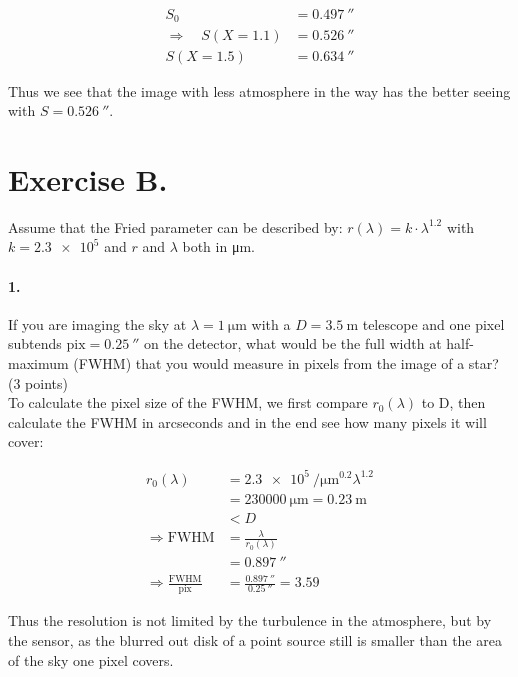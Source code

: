 \documentclass[11pt,a4paper,twoside]{article}
\begin{document}
\begin{align}
S_0 &= \SI{0.497}{\arcsecond} \\
\Rightarrow\quad S(X=1.1) &= \SI{0.526}{\arcsecond} \\
S(X=1.5) &= \SI{0.634}{\arcsecond}
\end{align}

Thus we see that the image with less atmosphere in the way has the better
seeing with $S = \SI{0.526}{\arcsecond}$. \\


\section*{Exercise B.}
Assume that the Fried parameter can be described by:
$r(\lambda) = k \cdot \lambda^{1.2}$ with $k = \num{2.3e5}$ and $r$ and
$\lambda$ both in \si{\micro\meter}.

\paragraph{1.} If you are imaging the sky at $\lambda = \SI{1}{\micro\meter}$
with a $D = \SI{3.5}{\meter}$ telescope and one pixel subtends
$\text{pix} = \SI{0.25}{\arcsecond}$ on the detector, what would be the full width at
half-maximum (FWHM) that you would measure in pixels from the image of a star?
(3 points)\\

To calculate the pixel size of the FWHM, we first compare $r_0(\lambda)$ to D,
then calculate the FWHM in arcseconds and in the end see how many pixels it
will cover:

\begin{align}
r_0(\lambda)    &= \SI{2.3e5}{\per\micro\meter\tothe{0.2}}\lambda^{1.2}  \\
                &= \SI{230000}{\micro\meter} = \SI{0.23}{\meter}         \\
                &< D                                                    \\
\Rightarrow 
\mathrm{FWHM}   &= \frac{\lambda}{r_0(\lambda)}                         \\
                &= \SI{0.897}{\arcsecond}                               \\
\Rightarrow
\frac{\mathrm{FWHM}}{\text{pix}} &= \frac{\SI{0.897}{\arcsecond}}{\SI{0.25}{\arcsecond}} = \num{3.59}
\end{align}

Thus the resolution is not limited by the turbulence in the atmosphere, but
by the sensor, as the blurred out disk of a point source still is smaller than
the area of the sky one pixel covers. \\
\end{document}
